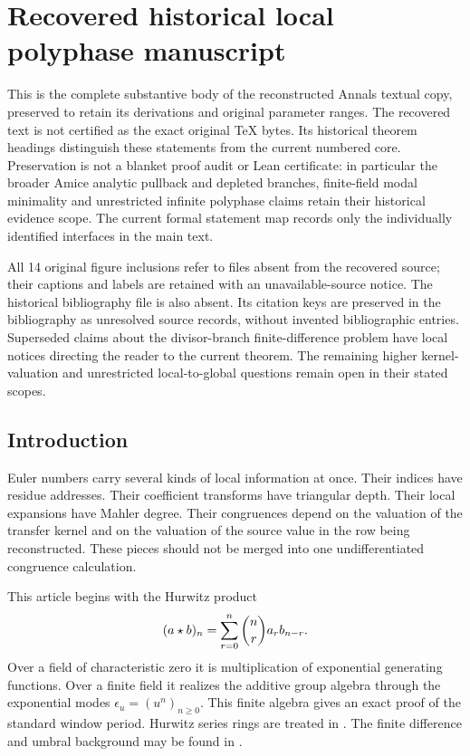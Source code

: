 \clearpage\section{Recovered historical local polyphase manuscript}\label{app:recovered}
This is the complete substantive body of the reconstructed Annals textual
copy, preserved to retain its derivations and original parameter ranges.
The recovered text is not certified as the exact original TeX bytes. Its
historical theorem headings distinguish these statements from the current
numbered core. Preservation is not a blanket proof audit or Lean certificate:
in particular the broader Amice analytic pullback and depleted branches,
finite-field modal minimality and unrestricted infinite polyphase claims
retain their historical evidence scope. The current formal statement map
records only the individually identified interfaces in the main text.

All 14 original figure inclusions refer to files absent from the recovered
source; their captions and labels are retained with an unavailable-source
notice. The historical bibliography file is also absent. Its citation keys
are preserved in the bibliography as unresolved source records, without
invented bibliographic entries. Superseded claims about the divisor-branch
finite-difference problem have local notices directing the reader to the
current theorem. The remaining higher kernel-valuation and unrestricted
local-to-global questions remain open in their stated scopes.

\subsection{Introduction}\label{hist:sec:introduction}

Euler numbers carry several kinds of local information at once. Their indices have residue addresses. Their coefficient transforms have triangular depth. Their local expansions have Mahler degree. Their congruences depend on the valuation of the transfer kernel and on the valuation of the source value in the row being reconstructed. These pieces should not be merged into one undifferentiated congruence calculation.

This article begins with the Hurwitz product
\[
(a\mathbin{\star} b)_n
=
\sum_{r=0}^{n}
\binom nr a_rb_{n-r}.
\]
Over a field of characteristic zero it is multiplication of exponential generating functions. Over a finite field it realizes the additive group algebra through the exponential modes \(\epsilon_u=(u^n)_{n\geq0}\). This finite algebra gives an exact proof of the standard window period. Hurwitz series rings are treated in \cite{Keigher1997,BarberoCerrutiMurru2018}. The finite difference and umbral background may be found in \cite{Roman1984,Comtet1974,GrahamKnuthPatashnik1994}.

